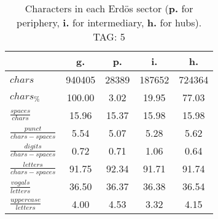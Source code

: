 \begin{table}[h!]
\begin{center}
\begin{tabular}{| l | c | c | c | c |}\hline
 & g. & p. & i. & h. \\\hline
$chars$ & 940405  & 28389  & 187652  & 724364 \\\hline
$chars_{\%}$ & 100.00  & 3.02  & 19.95  & 77.03 \\\hline
$\frac{spaces}{chars}$ & 15.96  & 15.37  & 15.98  & 15.98 \\\hline
$\frac{punct}{chars-spaces}$ & 5.54  & 5.07  & 5.28  & 5.62 \\\hline
$\frac{digits}{chars-spaces}$ & 0.72  & 0.71  & 1.06  & 0.64 \\\hline
$\frac{letters}{chars-spaces}$ & 91.75  & 92.34  & 91.71  & 91.74 \\\hline
$\frac{vogals}{letters}$ & 36.50  & 36.37  & 36.38  & 36.54 \\\hline
$\frac{uppercase}{letters}$ & 4.00  & 4.53  & 3.32  & 4.15 \\\hline
\end{tabular}
\caption{Characters in each Erd\"os sector ({{\bf p.}} for periphery, {{\bf i.}} for intermediary, 
    {{\bf h.}} for hubs). TAG: 5}
\end{center}
\end{table}